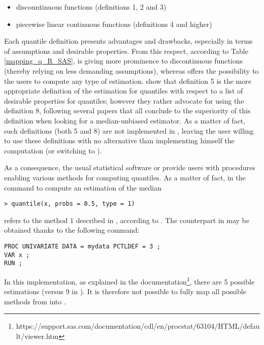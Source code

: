 \begin{itemize}
\item discountinuous functions (definitions 1, 2 and 3)
\item piecewise linear continuous functions (definitions 4 and higher)
\end{itemize}
Each quantile definition presents advantages and drawbacks, especially in terms of assumptions and desirable properties. From this respect, according to Table \ref{mapping_q_R_SAS}, \SAS is giving more prominence to discontinuous functions (thereby relying on less demanding assumptions), whereas \R offers the possibility to the users to compute any type of estimation. \cite{hyndman1996sample} show that definition 5 is the more appropriate definition of the estimation for quantiles with respect to a list of desirable properties for quantiles; however they rather advocate for using the definition 8, following several papers that all conclude to the superiority of this definition when looking for a median-unbiased estimator. As a matter of fact, such definitions (both 5 and 8) are not implemented in \SAS, leaving the user willing to use these definitions with no alternative than implementing himself the computation (or switching to \R).

\noindent As a consequence, the usual statistical software \R or \SAS provide users with procedures enabling various methods for computing quantiles. As a matter of fact, in \R the command to compute an estimation of the median

\lstset{language=R}
\begin{lstlisting}
> quantile(x, probs = 0.5, type = 1)
\end{lstlisting}

\noindent refers to the method 1 described in \cite{hyndman1996sample}, according to \cite{r2016r}. The counterpart in \SAS may be obtained thanks to the following command:

\lstset{language=SAS}
\begin{lstlisting}
PROC UNIVARIATE DATA = mydata PCTLDEF = 3 ;
VAR x ;
RUN ;
\end{lstlisting}

\noindent In this implementation, as explained in the \SAS documentation\footnote{https://support.sas.com/documentation/cdl/en/procstat/63104/HTML/default/viewer.htm}, there are 5 possible estimations (versus 9 in \R). It is therefore not possible to fully map all possible methods from \R into \SAS.

